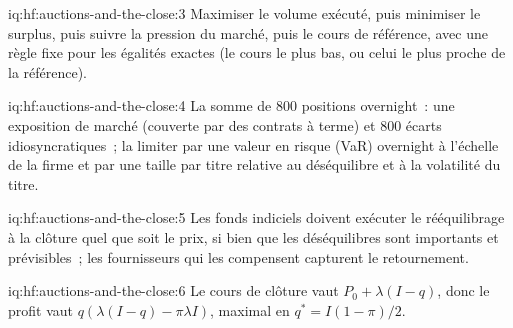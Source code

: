 \begin{solution}{iq:hf:auctions-and-the-close:3}
Maximiser le volume exécuté, puis minimiser le surplus, puis suivre la pression du marché, puis le cours de référence, avec une règle fixe pour les égalités exactes (le
cours le plus bas, ou celui le plus proche de la référence).
\end{solution}

\begin{solution}{iq:hf:auctions-and-the-close:4}
La somme de 800 positions overnight~: une exposition de marché (couverte par des contrats à terme) et 800 écarts idiosyncratiques~; la limiter par une valeur en
risque (VaR) overnight à l'échelle de la firme et par une taille par titre relative au déséquilibre et à la volatilité du titre.
\end{solution}

\begin{solution}{iq:hf:auctions-and-the-close:5}
Les fonds indiciels doivent exécuter le rééquilibrage à la clôture quel que soit le prix, si bien que les déséquilibres sont importants et prévisibles~; les fournisseurs qui les compensent capturent le
retournement.
\end{solution}

\begin{solution}{iq:hf:auctions-and-the-close:6}
Le cours de clôture vaut $P_0+\lambda(I-q)$, donc le profit vaut $q(\lambda(I-q)-\pi\lambda I)$, maximal en $q^\ast=I(1-\pi)/2$.
\end{solution}
